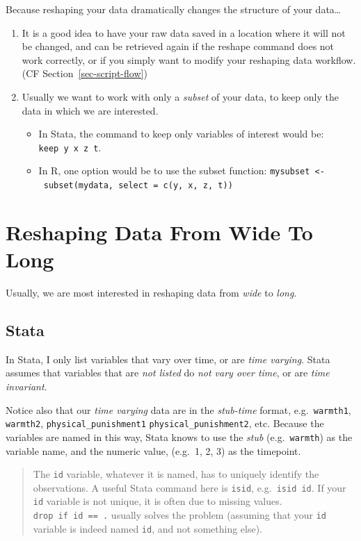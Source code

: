 \documentclass[
  letterpaper,
  DIV=11,
  numbers=noendperiod]{scrreprt}
\providecommand{\tightlist}{%
  \setlength{\itemsep}{0pt}\setlength{\parskip}{0pt}}\usepackage{longtable,booktabs,array}
\begin{document}
Because reshaping your data dramatically changes the structure of your
data\ldots{}

\begin{enumerate}
\def\labelenumi{\arabic{enumi}.}
\tightlist
\item
  It is a good idea to have your raw data saved in a location where it
  will not be changed, and can be retrieved again if the reshape command
  does not work correctly, or if you simply want to modify your
  reshaping data workflow.(CF Section~\ref{sec-script-flow})
\item
  Usually we want to work with only a \emph{subset} of your data, to
  keep only the data in which we are interested.

  \begin{itemize}
  \tightlist
  \item
    In Stata, the command to keep only variables of interest would be:
    \texttt{keep\ y\ x\ z\ t}.
  \item
    In R, one option would be to use the subset function:
    \texttt{mysubset\ \textless{}-\ subset(mydata,\ select\ =\ c(y,\ x,\ z,\ t))}
  \end{itemize}
\end{enumerate}

\section{Reshaping Data From Wide To
Long}\label{reshaping-data-from-wide-to-long}

Usually, we are most interested in reshaping data from \emph{wide} to
\emph{long}.

\subsection{Stata}

In Stata, I only list variables that vary over time, or are \emph{time
varying}. Stata assumes that variables that are \emph{not listed} do
\emph{not vary over time}, or are \emph{time invariant}.

Notice also that our \emph{time varying} data are in the
\emph{stub-time} format, e.g.~\texttt{warmth1}, \texttt{warmth2},
\texttt{physical\_punishment1} \texttt{physical\_punishment2}, etc.
Because the variables are named in this way, Stata knows to use the
\emph{stub} (e.g.~\texttt{warmth}) as the variable name, and the numeric
value, (e.g.~1, 2, 3) as the timepoint.

\begin{quote}
The \texttt{id} variable, whatever it is named, has to uniquely identify
the observations. A useful Stata command here is \texttt{isid},
e.g.~\texttt{isid\ id}. If your \texttt{id} variable is not unique, it
is often due to missing values. \texttt{drop\ if\ id\ ==\ .} usually
solves the problem (assuming that your \texttt{id} variable is indeed
named \texttt{id}, and not something else).
\end{quote}
\end{document}

